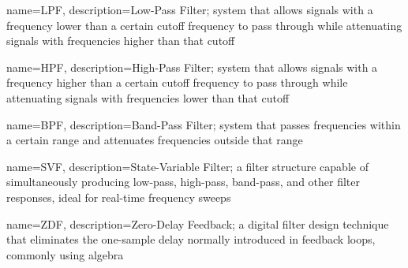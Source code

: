 

{
    name={LPF},
    description={Low-Pass Filter; system that allows signals with a frequency lower 
    than a certain cutoff frequency to pass through while attenuating signals 
    with frequencies higher than that cutoff}
}


{
    name={HPF},
    description={High-Pass Filter; system that allows signals with a frequency higher 
than a certain cutoff frequency to pass through while attenuating signals 
with frequencies lower than that cutoff}
}


{
    name={BPF},
    description={Band-Pass Filter; system that passes frequencies within a certain 
range and attenuates frequencies outside that range}
}





{
    name={SVF},
    description={State-Variable Filter; a filter structure capable of simultaneously producing 
    low-pass, high-pass, band-pass, and other filter responses, ideal for real-time frequency sweeps}
}


{
    name={ZDF},
    description={Zero-Delay Feedback; a digital filter design technique that eliminates 
    the one-sample delay normally introduced in feedback loops, commonly using algebra}
}

